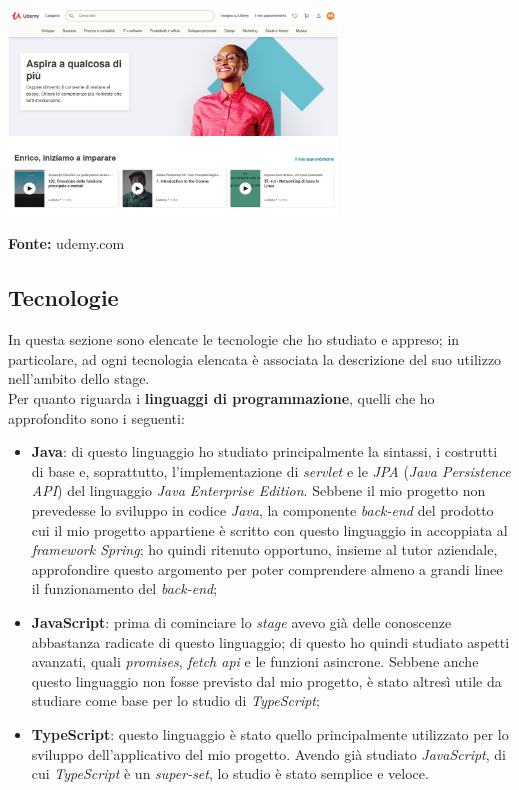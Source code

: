 \begin{minipage}{\linewidth}
  \centering
    \includegraphics[height=5.5cm]{immagini/udemy}
  \caption*{\textbf{Fonte:} udemy.com}
\end{minipage}

\subsection{Tecnologie}

In questa sezione sono elencate le tecnologie che ho studiato e appreso; in particolare, ad ogni tecnologia elencata è associata la descrizione del suo utilizzo nell'ambito dello stage. \\
Per quanto riguarda i \textbf{linguaggi di programmazione}, quelli che ho approfondito sono i seguenti:

\begin{itemize}
  \item \textbf{Java}: di questo linguaggio ho studiato principalmente la sintassi, i costrutti di base e, soprattutto, l'implementazione di \textit{servlet} e le \textit{JPA} (\textit{Java Persistence API}) del linguaggio \textit{Java Enterprise Edition}. Sebbene il mio progetto non prevedesse lo sviluppo in codice \textit{Java}, la componente \textit{back-end} del prodotto cui il mio progetto appartiene è scritto con questo linguaggio in accoppiata al \textit{framework Spring}; ho quindi ritenuto opportuno, insieme al tutor aziendale, approfondire questo argomento per poter comprendere almeno a grandi linee il funzionamento del \textit{back-end};
  \item \textbf{JavaScript}: prima di cominciare lo \textit{stage} avevo già delle conoscenze abbastanza radicate di questo linguaggio; di questo ho quindi studiato aspetti avanzati, quali \textit{promises}, \textit{fetch api} e le funzioni asincrone. Sebbene anche questo linguaggio non fosse previsto dal mio progetto, è stato altresì utile da studiare come base per lo studio di \textit{TypeScript};
  \item \textbf{TypeScript}: questo linguaggio è stato quello principalmente utilizzato per lo sviluppo dell'applicativo del mio progetto. Avendo già studiato \textit{JavaScript}, di cui \textit{TypeScript} è un \textit{super-set}, lo studio è stato semplice e veloce.
\end{itemize}

